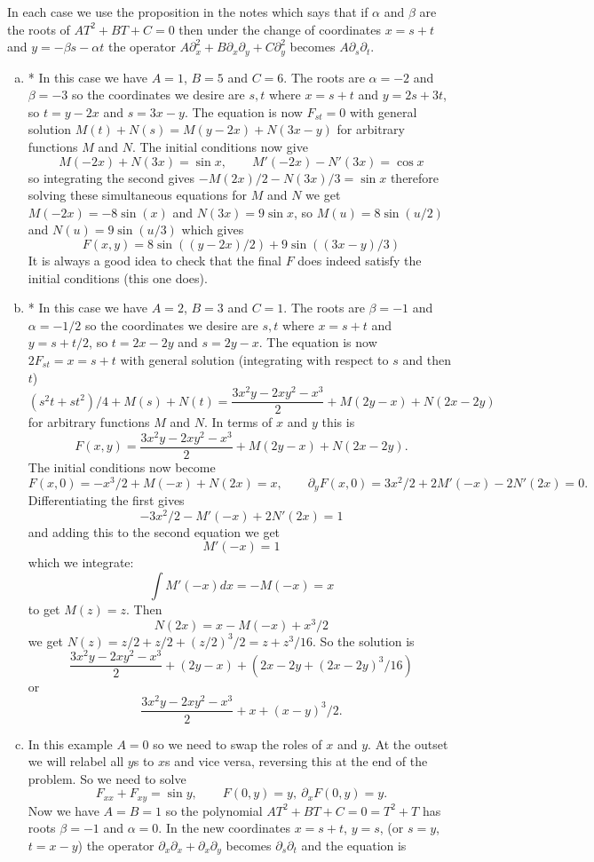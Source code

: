 \documentclass[12pt]{article}
\begin{document}
\begin{answer}
In each case we use the proposition in the notes which says that if $\alpha$ and $\beta$ are the roots of $AT^2+BT+C=0$ then under the change of coordinates $x=s+t$ and $y=-\beta s-\alpha t$ the operator $A\partial_x^2+B\partial_x\partial_y+C\partial_y^2$ becomes $A\partial_s\partial_t$.
\begin{enumerate}[(a)]
\item * In this case we have $A=1$, $B=5$ and $C=6$. The roots are $\alpha=-2$ and $\beta=-3$ so the coordinates we desire are $s,t$ where $x=s+t$ and $y=2s+3t$, so $t=y-2x$ and $s=3x-y$. The equation is now $F_{st}=0$ with general solution $M(t)+N(s)=M(y-2x)+N(3x-y)$ for arbitrary functions $M$ and $N$.
The initial conditions now give
\[M(-2x)+N(3x)=\sin x,\qquad M'(-2x)-N'(3x)=\cos x\]
so integrating the second gives $-M(2x)/2-N(3x)/3=\sin x$ therefore solving these simultaneous equations for $M$ and $N$ we get $M(-2x)=-8\sin(x)$ and $N(3x)=9\sin x$, so $M(u)=8\sin(u/2)$ and $N(u)=9\sin(u/3)$ which gives
\[F(x,y)=8\sin((y-2x)/2)+9\sin((3x-y)/3)\]
It is always a good idea to check that the final $F$ does indeed satisfy the initial conditions (this one does).
\item * In this case we have $A=2$, $B=3$ and $C=1$. The roots are $\beta=-1$ and $\alpha=-1/2$ so the coordinates we desire are $s,t$ where $x=s+t$ and $y=s+t/2$, so $t=2x-2y$ and $s=2y-x$. The equation is now $2F_{st}=x=s+t$ with general solution (integrating with respect to $s$ and then $t$)
\[(s^2t+st^2)/4+M(s)+N(t)=\frac{3x^2y-2xy^2-x^3}{2}+M(2y-x)+N(2x-2y)\]
for arbitrary functions $M$ and $N$.
In terms of $x$ and $y$ this is
\[F(x,y)=\frac{3x^2y-2xy^2-x^3}{2}+M(2y-x)+N(2x-2y).\]
The initial conditions now become
\[F(x,0)=-x^3/2+M(-x)+N(2x)=x,\qquad\partial_yF(x,0)=3x^2/2+2M'(-x)-2N'(2x)=0.\]
Differentiating the first gives
\[-3x^2/2-M'(-x)+2N'(2x)=1\]
and adding this to the second equation we get
\[M'(-x)=1\]
which we integrate:
\[\int M'(-x)dx=-M(-x)=x\]
to get $M(z)=z$. Then
\[N(2x)=x-M(-x)+x^3/2\]
we get $N(z)=z/2+z/2+(z/2)^3/2=z+z^3/16$. So the solution is
\[\frac{3x^2y-2xy^2-x^3}{2}+(2y-x)+(2x-2y+(2x-2y)^3/16)\]
or
\[\frac{3x^2y-2xy^2-x^3}{2}+x+(x-y)^3/2.\]
\item In this example $A=0$ so we need to swap the roles of $x$ and $y$. At the outset we will relabel all $y$s to $x$s and vice versa, reversing this at the end of the problem. So we need to solve
\[F_{xx}+F_{xy}=\sin y,\qquad F(0,y)=y,\ \partial_xF(0,y)=y.\]
Now we have $A=B=1$ so the polynomial $AT^2+BT+C=0=T^2+T$ has roots $\beta=-1$ and $\alpha=0$. In the new coordinates $x=s+t$, $y=s$, (or $s=y$, $t=x-y$) the operator $\partial_x\partial_x+\partial_x\partial_y$ becomes $\partial_s\partial_t$ and the equation is

\end{enumerate}
\end{answer}
\end{document}

